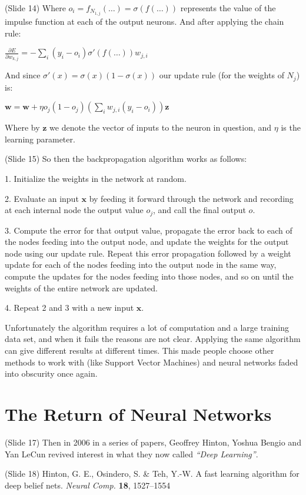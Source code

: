 \documentclass[twocolumn]{article}
\begin{document}
(Slide 14) Where \(o_i = f_{N_{1,j}}(\dots) = \sigma(f(\dots))\) represents the
value of the impulse function at each of the output neurons. And after applying
the chain rule:

\(\displaystyle \frac{\partial E}{\partial w_{k,j}} = -\sum_i (y_i -
o_i)\sigma'(f(\dots)) w_{j,i}\)

And since \(\sigma'(x) = \sigma(x)(1 - \sigma(x))\) our update rule (for the
weights of \(N_j\)) is:

\(\displaystyle \mathbf{w} = \mathbf{w} + \eta o_j(1-o_j) \left ( \sum_i
    w_{j,i} (y_i - o_i) \right ) \mathbf{z}\)

Where by \(\mathbf{z}\) we denote the vector of inputs to the neuron in
question, and \(\eta\) is the learning parameter.

(Slide 15) So then the backpropagation algorithm works as follows:

1. Initialize the weights in the network at random.

2. Evaluate an input \(\mathbf{x}\) by feeding it forward through the network
and recording at each internal node the output value \(o_j\), and call the final
output \(o\).

3. Compute the error for that output value, propagate the error back to each of
the nodes feeding into the output node, and update the weights for the output
node using our update rule. Repeat this error propagation followed by a weight
update for each of the nodes feeding into the output node in the same way,
compute the updates for the nodes feeding into those nodes, and so on until the
weights of the entire network are updated.

4. Repeat 2 and 3 with a new input \(\mathbf{x}\).

Unfortunately the algorithm requires a lot of computation and a large training
data set, and when it fails the reasons are not clear. Applying the same
algorithm can give different results at different times. This made people choose
other methods to work with (like Support Vector Machines) and neural networks
faded into obscurity once again.

\section{The Return of Neural Networks}
(Slide 17)  Then in 2006 in a series of papers,
Geoffrey Hinton, Yoshua Bengio and Yan LeCun revived interest in what they now
called \textit{“Deep Learning”}.

(Slide 18) Hinton, G. E., Osindero, S. \& Teh, Y.-W. A fast learning algorithm
for deep belief nets. \textit{Neural Comp.} \textbf{18}, 1527–1554
\end{document}
